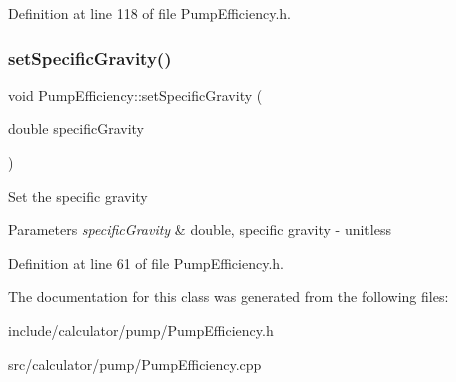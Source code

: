 Definition at line 118 of file Pump\+Efficiency.\+h.

\mbox{\label{class_pump_efficiency_afc8b3ecd0fe1a356c82042aa0fc84024}} 
\subsubsection{\texorpdfstring{set\+Specific\+Gravity()}{setSpecificGravity()}}
{\footnotesize\ttfamily void Pump\+Efficiency\+::set\+Specific\+Gravity (\begin{DoxyParamCaption}\item[{double}]{specific\+Gravity }\end{DoxyParamCaption})\hspace{0.3cm}{\ttfamily [inline]}}

Set the specific gravity


\begin{DoxyParams}{Parameters}
{\em specific\+Gravity} & double, specific gravity -\/ unitless \\
\hline
\end{DoxyParams}


Definition at line 61 of file Pump\+Efficiency.\+h.



The documentation for this class was generated from the following files\+:\begin{DoxyCompactItemize}
\item 
include/calculator/pump/Pump\+Efficiency.\+h\item 
src/calculator/pump/Pump\+Efficiency.\+cpp\end{DoxyCompactItemize}

